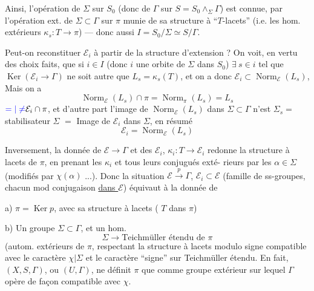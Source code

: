 
Ainsi, l'opération de
$\Sigma$ sur $S_0$ (donc de $\Gamma$ sur $S=S_0\wedge_{\Sigma}\Gamma$)
est connue, par l'opération ext. de $\Sigma\subset\Gamma$ sur
$\pi$ munie de sa structure  à
``$T$-lacets'' (i.e. les hom. extérieurs
$\kappa_s:T\longrightarrow\pi$) --- donc aussi $I=S_0/\Sigma\simeq S/\Gamma$.

Peut-on reconstituer $\mathcal E_i$  à partir de la
structure d'extension ? On voit, 
en vertu des choix faits,
que si $i\in I$ (donc $i$ une orbite de
$\Sigma$ dans $S_0$) $\exists\ s\in i$ tel que $\operatorname{Ker}(\mathcal E_i\longrightarrow\Gamma)$
ne soit autre que $L_s=\kappa_s(T)$, et on a
donc $\mathcal E_i\subset\operatorname{Norm}_{\mathcal E}(L_s)$, Mais
on a
\[
\operatorname{Norm}_{\mathcal E}(L_s)\cap\pi
=\operatorname{Norm}_{\pi}(L_s)=L_s
\]
$\textcolor{blue}{=|\ne}\mathcal E_i\cap\pi$, et d'autre part l'image de
$\operatorname{Norm}_{\mathcal E}(L_s)$ dans $\Sigma\subset\Gamma$ n'est  \inserted{$\subset$}
$\Sigma_s=$ stabilisateur   $\Sigma$
$=$ Image de $\mathcal E_i$ dans $\Sigma$,
 en résumé
\[
\mathcal E_i=\operatorname{Norm}_{\mathcal E}(L_s)
\]


Inversement, la donnée de $\mathcal E\longrightarrow\Gamma$
et des $\mathcal E_i$, $\kappa_i:T\longrightarrow\mathcal E_i$ redonne la
structure à lacets de $\pi$, en prenant
les $\kappa_i$ et tous leurs conjugués exté-
rieurs  par les $\alpha\in\Sigma$ (modifiés par $\chi(\alpha)$ ...).
Donc la  situation $\mathcal E\xrightarrow{p}\Gamma$, $\mathcal E_i\subset\mathcal E$
 (famille de ss-groupes, chacun
 mod conjugaison \uline{dans $\mathcal E$}) équivaut
à la donnée de

a) $\pi=\operatorname{Ker}p$, avec sa structure à lacets
(
$T$ dans $\pi$)

b) Un  groupe $\Sigma\subset\Gamma$, et
un hom.
\[
\Sigma\longrightarrow\text{Teichmüller étendu de }\pi
\]
(autom. extérieurs de $\pi$,
respectant la structure à lacets
modulo signe
compatible avec le caractère $\chi|\Sigma$ et
le caractère ``signe'' sur Teichmüller étendu.
En fait, $(X,S,\Gamma)$, ou $(U,\Gamma)$, ne définit
$\pi$ que comme groupe extérieur  sur lequel
$\Gamma$ opère de façon compatible avec $\chi$.
